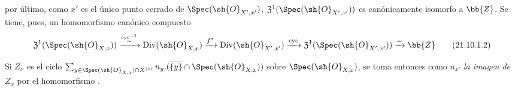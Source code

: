 \begin{env}[21.10.1]
\begin{enumerate}[label=\arabic*\textsuperscript{o}]
por último, como $x'$ es el único punto cerrado de $\Spec(\sh{O}_{X',x'})$, $\mathfrak{Z}^1(\Spec(\sh{O}_{X',x'}))$ es canónicamente isomorfo a $\bb{Z}$.
Se tiene, pues, un homomorfismo canónico compuesto
\[
\label{IV.21.10.1.2}
  \mathfrak{Z}^1(\Spec(\sh{O}_{X,x}))
  \xrightarrow{\overset{\operatorname{cyc}^{-1}}{\sim}}\operatorname{Div}(\sh{O}_{X,x})
  \xrightarrow{f^*}\operatorname{Div}(\sh{O}_{X',x'})
  \xrightarrow{\operatorname{cyc}}\mathfrak{Z}^1(\Spec(\sh{O}_{X',x'}))
  \xrightarrow{\sim}\bb{Z}
  \tag{21.10.1.2}
\]
\end{enumerate}
Si $Z_x$ es el ciclo $\sum_{y\in\Spec(\sh{O}_{X,x})\cap X^{(1)}}n_y.(\overline{\{y\}}\cap\Spec(\sh{O}_{X,x}))$ sobre $\Spec(\sh{O}_{X,x})$, se toma entonces como $n_{x'}$ \emph{la imagen de} $Z_x$ por el homomorfismo .
\end{env}


